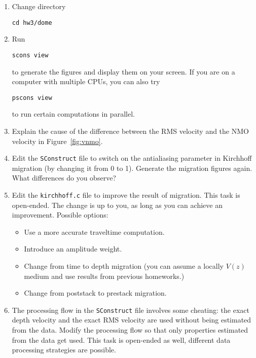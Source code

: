 \begin{enumerate}
\begin{enumerate}
\item Change directory 
\begin{verbatim}
cd hw3/dome
\end{verbatim}
\item Run
\begin{verbatim}
scons view
\end{verbatim}
to generate the figures and display them on your screen.
If you are on a computer with multiple CPUs, you
can also try
\begin{verbatim}
pscons view
\end{verbatim}
to run certain computations in parallel.
\item Explain the cause of the difference between the RMS velocity and the NMO velocity in Figure~\ref{fig:vnmo}.
\item Edit the \texttt{SConstruct} file to switch on the antialiasing parameter in Kirchhoff migration 
(by changing it from 0 to 1). Generate the migration figures again. What differences do you observe?
\item Edit the \texttt{kirchhoff.c} file to improve the result of migration. This task is open-ended. 
The change is up to you, as long as you can achieve an improvement. Possible options:
\begin{itemize}
\item Use a more accurate traveltime computation.
\item Introduce an amplitude weight.
\item Change from time to depth migration (you can assume a locally $V(z)$ medium and use results from previous homeworks.)
\item Change from poststack to prestack migration.
\end{itemize}
\item The processing flow in the \texttt{SConstruct} file involves some cheating: the exact 
depth velocity and the exact RMS velocity are used without being
estimated from the data. Modify the processing flow so that only
properties estimated from the data get used. This task is open-ended
as well, different data processing strategies are possible.
\end{enumerate}

\lstset{language=python,numbers=left,numberstyle=\tiny,showstringspaces=false}


\lstset{language=c,numbers=left,numberstyle=\tiny,showstringspaces=false}



\end{enumerate}
